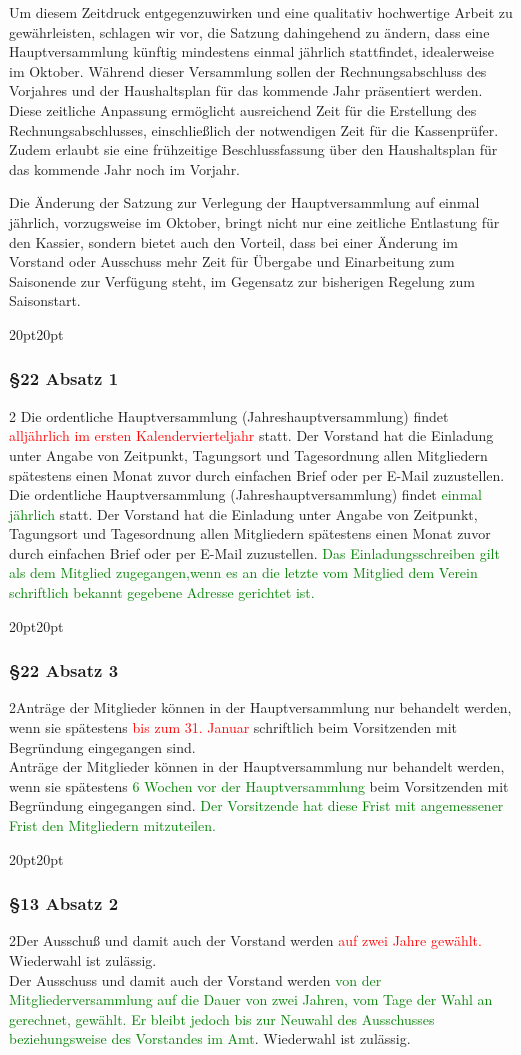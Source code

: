 \documentclass[10pt,a4paper,parskip=half]{scrartcl}
\newcommand{\new}[1]{\textcolor{Green}{#1}}
\newcommand{\old}[1]{\textcolor{Red}{#1}}
\newcommand{\change}[1]{
  \begin{adjustwidth}{20pt}{20pt}
    #1
  \end{adjustwidth}
}
\newcommand{\compare}[3]{\change{\subsubsection*{#1}\begin{multicols}{2}#2\columnbreak\\#3\end{multicols}}}
\begin{document}
  Um diesem Zeitdruck entgegenzuwirken und eine qualitativ hochwertige Arbeit zu gewährleisten, schlagen wir vor, die Satzung dahingehend zu ändern, dass eine Hauptversammlung künftig mindestens einmal jährlich stattfindet, idealerweise im Oktober. Während dieser Versammlung sollen der Rechnungsabschluss des Vorjahres und der Haushaltsplan für das kommende Jahr präsentiert werden. Diese zeitliche Anpassung ermöglicht ausreichend Zeit für die Erstellung des Rechnungsabschlusses, einschließlich der notwendigen Zeit für die Kassenprüfer. Zudem erlaubt sie eine frühzeitige Beschlussfassung über den Haushaltsplan für das kommende Jahr noch im Vorjahr.

  Die Änderung der Satzung zur Verlegung der Hauptversammlung auf einmal jährlich, vorzugsweise im Oktober, bringt nicht nur eine zeitliche Entlastung für den Kassier, sondern bietet auch den Vorteil, dass bei einer Änderung im Vorstand oder Ausschuss mehr Zeit für Übergabe und Einarbeitung zum Saisonende zur Verfügung steht, im Gegensatz zur bisherigen Regelung zum Saisonstart.
  
  \compare{§22 Absatz 1}{
    Die ordentliche Hauptversammlung (Jahreshauptversammlung) findet \old{alljährlich im ersten Kalendervierteljahr} statt.
    Der Vorstand hat die Einladung unter Angabe von Zeitpunkt,
    Tagungsort und Tagesordnung allen Mitgliedern spätestens einen Monat zuvor durch einfachen Brief oder per E-Mail zuzustellen.
  }{
    Die ordentliche Hauptversammlung (Jahreshauptversammlung) findet \new{einmal jährlich} statt.
    Der Vorstand hat die Einladung unter Angabe von Zeitpunkt,
    Tagungsort und Tagesordnung allen Mitgliedern spätestens einen Monat zuvor durch einfachen Brief oder per E-Mail zuzustellen.
    \new{Das Einladungsschreiben gilt als dem Mitglied zugegangen,wenn es an die letzte vom Mitglied dem Verein schriftlich bekannt gegebene Adresse gerichtet ist.}
  }

  \compare{§22 Absatz 3}{Anträge der Mitglieder können in der Haupt\-ver\-samm\-lung nur behandelt werden,
  wenn sie spätestens \old{bis zum 31. Januar} schriftlich beim Vorsitzenden mit Begründung eingegangen sind.}
  {Anträge der Mitglieder können in der Haupt\-ver\-samm\-lung nur behandelt werden,
  wenn sie spätestens \new{6 Wochen vor der Hauptversammlung} beim Vorsitzenden mit Begründung eingegangen sind.
  \new{Der Vorsitzende hat diese Frist mit angemessener Frist den Mitgliedern mitzuteilen.}
  }

  \compare{§13 Absatz 2}
  {Der Ausschuß und damit auch der Vorstand werden \old{auf zwei Jahre gewählt.}
  Wiederwahl ist zulässig.}
  {Der Ausschuss und damit auch der Vorstand werden \new{von der Mitgliederversammlung auf die Dauer von zwei Jahren, vom Tage der Wahl an gerechnet, gewählt.
  Er bleibt jedoch bis zur Neuwahl des Ausschusses beziehungsweise des Vorstandes im Amt}.  Wiederwahl ist zulässig.}
\end{document}
